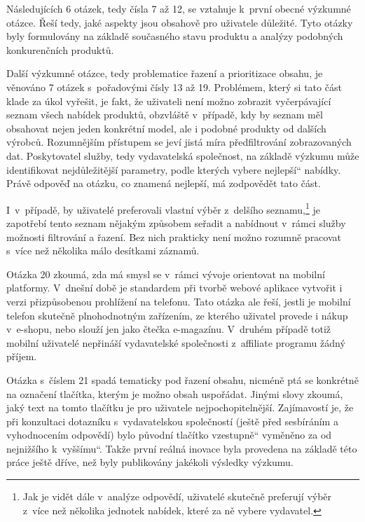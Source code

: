 \documentclass[12pt,twoside,openany]{fithesis}
\begin{document}
Následujících 6 otázek, tedy čísla 7 až 12, se vztahuje k~první obecné 
výzkumné otázce. Řeší tedy, jaké aspekty jsou obsahově pro uživatele 
důležité. Tyto otázky byly formulovány na základě současného stavu 
produktu a analýzy podobných konkurenčních produktů.

Další výzkumné otázce, tedy problematice řazení a prioritizace obsahu, 
je věnováno 7 otázek s~pořadovými čísly 13 až 19. Problémem, který si 
tato část klade za úkol vyřešit, je fakt, že uživateli není možno 
zobrazit vyčerpávající seznam všech nabídek produktů, obzvláště 
v~případě, kdy by seznam měl obsahovat nejen jeden konkrétní model, ale i 
podobné produkty od dalších výrobců. Rozumnějším přístupem se jeví 
jistá míra předfiltrování zobrazovaných dat. Poskytovatel služby, tedy 
vydavatelská společnost, na základě výzkumu může identifikovat 
nejdůležitější parametry, podle kterých vybere \glqq 
nejlepší\textquotedblleft{} nabídky. Právě odpověď na otázku, co 
znamená nejlepší, má zodpovědět tato část.

I~v~případě, by uživatelé preferovali vlastní výběr z~delšího 
seznamu,\footnote{
    Jak je vidět dále v~analýze odpovědí, uživatelé skutečně 
preferují výběr z~více než několika jednotek nabídek, které za ně 
vybere vydavatel.
} je zapotřebí tento
seznam nějakým způsobem seřadit a nabídnout v~rámci služby možnosti 
filtrování a řazení. Bez nich prakticky není možno rozumně pracovat 
s~více než několika málo desítkami záznamů.

Otázka 20 zkoumá, zda má smysl se v~rámci vývoje orientovat na mobilní 
platformy. V~dnešní době je standardem při tvorbě webové aplikace 
vytvořit i verzi přizpůsobenou prohlížení na telefonu. Tato otázka ale 
řeší, jestli je mobilní telefon skutečně plnohodnotným zařízením, ze 
kterého uživatel provede i nákup v~e-shopu, nebo slouží jen jako čtečka 
e-magazínu. V~druhém případě totiž mobilní uživatelé nepřináší 
vydavatelské společnosti z~affiliate programu žádný příjem.

Otázka s~číslem 21 spadá tematicky pod řazení obsahu, nicméně ptá se 
konkrétně na označení tlačítka, kterým je možno obsah uspořádat. 
Jinými slovy zkoumá, jaký text na tomto tlačítku je pro uživatele 
nejpochopitelnější. Zajímavostí je, že při konzultaci dotazníku 
s~vydavatelskou společností (ještě před sesbíráním a vyhodnocením 
odpovědí) bylo původní tlačítko \glqq vzestupně\textquotedblleft{} 
vyměněno za \glqq od nejnižšího k~vyššímu\textquotedblleft{}. Takže 
první reálná inovace byla provedena na základě této práce ještě 
dříve, než byly publikovány jakékoli výsledky výzkumu.
\end{document}
